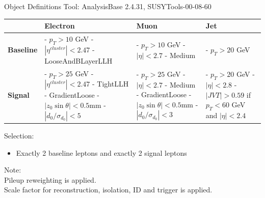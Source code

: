 \documentclass[mathserif,serif]{beamer}
\begin{document}
\begin{frame}{Object Definitions}
\small
Tool: AnalysisBase 2.4.31, SUSYTools-00-08-60\\

\centering
\begin{table}
\small
\begin{tabularx}{\textwidth}{p{1.5cm} | p{3cm} | p{3cm} | p{3cm}}
& \textbf{Electron} & \textbf{Muon} & \textbf{Jet}\\
\hline
\textbf{Baseline}
& - $p_T>10$ GeV \newline - $|\eta^{cluster}| < 2.47$ \newline - LooseAndBLayerLLH
& - $p_T>10$ GeV \newline - $|\eta| < 2.7$ \newline - Medium
& - $p_T>20$ GeV \\
\hline
\textbf{Signal}
& - $p_T > 25$ GeV \newline - $|\eta^{cluster}| < 2.47$ \newline - TightLLH \newline - GradientLoose \newline - $|z_0 \sin \theta| < 0.5$mm \newline - $|d_0/\sigma_{d_0}| < 5$
& - $p_T > 25$ GeV \newline - $|\eta| < 2.7$ \newline - Medium \newline - GradientLoose \newline - $|z_0 \sin \theta| < 0.5$mm \newline - $|d_0/\sigma_{d_0}| < 3$
& - $p_T > 20$ GeV \newline - $|\eta|<2.8$ \newline \newline - $|JVT| > 0.59$ \newline if $p_T < 60$ GeV \newline and $|\eta| < 2.4$
\end{tabularx}
\end{table}

\raggedright
Selection:
\begin{itemize}
\item Exactly 2 baseline leptons and exactly 2 signal leptons
\end{itemize}

\tiny
Note: \\
Pileup reweighting is applied. \\
Scale factor for reconstruction, isolation, ID and trigger is applied.
\end{frame}
\end{document}
